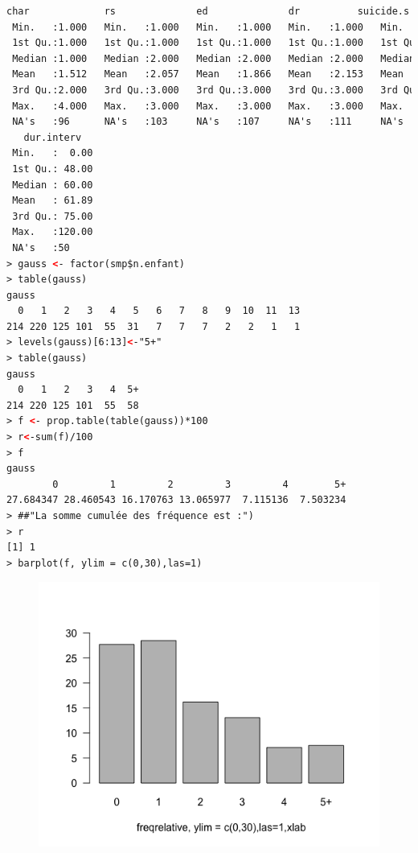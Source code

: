 \begin{lstlisting}[language=html]
      char             rs              ed              dr          suicide.s        suicide.hr      suicide.past   
 Min.   :1.000   Min.   :1.000   Min.   :1.000   Min.   :1.000   Min.   :0.0000   Min.   :0.0000   Min.   :0.0000  
 1st Qu.:1.000   1st Qu.:1.000   1st Qu.:1.000   1st Qu.:1.000   1st Qu.:0.0000   1st Qu.:0.0000   1st Qu.:0.0000  
 Median :1.000   Median :2.000   Median :2.000   Median :2.000   Median :0.0000   Median :0.0000   Median :0.0000  
 Mean   :1.512   Mean   :2.057   Mean   :1.866   Mean   :2.153   Mean   :0.7942   Mean   :0.2013   Mean   :0.2841  
 3rd Qu.:2.000   3rd Qu.:3.000   3rd Qu.:3.000   3rd Qu.:3.000   3rd Qu.:1.0000   3rd Qu.:0.0000   3rd Qu.:1.0000  
 Max.   :4.000   Max.   :3.000   Max.   :3.000   Max.   :3.000   Max.   :5.0000   Max.   :1.0000   Max.   :1.0000  
 NA's   :96      NA's   :103     NA's   :107     NA's   :111     NA's   :41       NA's   :39       NA's   :14      
   dur.interv    
 Min.   :  0.00  
 1st Qu.: 48.00  
 Median : 60.00  
 Mean   : 61.89  
 3rd Qu.: 75.00  
 Max.   :120.00  
 NA's   :50      
> gauss <- factor(smp$n.enfant)
> table(gauss)
gauss
  0   1   2   3   4   5   6   7   8   9  10  11  13 
214 220 125 101  55  31   7   7   7   2   2   1   1 
> levels(gauss)[6:13]<-"5+"
> table(gauss)
gauss
  0   1   2   3   4  5+ 
214 220 125 101  55  58 
> f <- prop.table(table(gauss))*100
> r<-sum(f)/100
> f
gauss
        0         1         2         3         4        5+ 
27.684347 28.460543 16.170763 13.065977  7.115136  7.503234 
> ##"La somme cumulée des fréquence est :")
> r
[1] 1
> barplot(f, ylim = c(0,30),las=1)
\end{lstlisting}

\begin{figure}[H]\begin{center}\includegraphics[scale=0.45]{ilu/lab2-3.png}\end{center}\end{figure}

